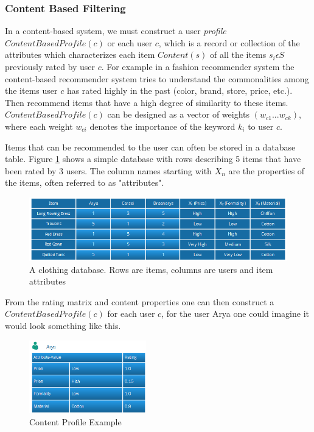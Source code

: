 \subsubsection{Content Based Filtering}

In a content-based system, we must construct a user \emph{profile}
$ContentBasedProfile(c)$ or each user $c$, which is a record or collection of
the attributes which characterizes each item $Content(s)$ of all the items
$s_{i} \epsilon S$ previously rated by user $c$. For example in a fashion
recommender system the content-based recommender system tries to understand the
commonalities among the items user $c$ has rated highly in the past (color,
brand, store, price, etc.). Then recommend items that have a high degree of
similarity to these items. $ContentBasedProfile(c)$ can be designed as a vector
of weights $(w_{c1} ... w_{ck})$, where each weight $w_{ci}$ denotes the
importance of the keyword $k_{i}$ to user $c$.

Items that can be recommended to the user can often be stored in a database
table. Figure \ref{figure:contentbaseddb} shows a simple database with rows
describing 5 items that have been rated by 3 users. The column names starting
with $X_{n}$ are the properties of the items, often referred to as
"attributes".

\begin{figure}[H]
    \includegraphics[width=5in]{image/contentbaseddb.png}
    \centering
    \caption[A clothing database]{A clothing database. Rows are items, columns are users and item attributes}
    \label{figure:contentbaseddb}
\end{figure}

From the rating matrix and content properties one can then construct a
$ContentBasedProfile(c)$ for each user $c$, for the user Arya one could imagine
it would look something like this.

\begin{figure}[H]
    \includegraphics[width=2in]{image/contentprofile.png}
    \centering
    \caption[Content Profile Example]{Content Profile Example}
    \label{figure:contentprofile}
\end{figure}

